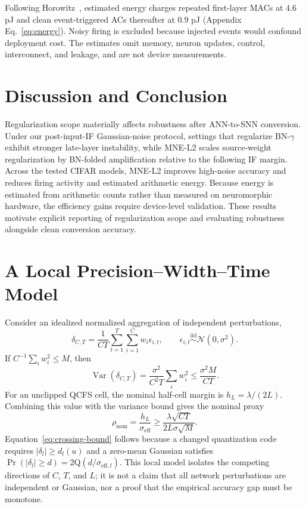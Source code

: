 \documentclass{article}
\begin{document}
Following Horowitz~\cite{horowitz2014computing}, estimated energy charges repeated first-layer MACs at $4.6$ pJ and clean event-triggered ACs thereafter at $0.9$ pJ (Appendix Eq.~\ref{eq:energy}). Noisy firing is excluded because injected events would confound deployment cost. The estimates omit memory, neuron updates, control, interconnect, and leakage, and are not device measurements.
\FloatBarrier

\section{Discussion and Conclusion}

Regularization scope materially affects robustness after ANN-to-SNN conversion. Under our post-input-IF Gaussian-noise protocol, settings that regularize BN-$\gamma$ exhibit stronger late-layer instability, while MNE-L2 scales source-weight regularization by BN-folded amplification relative to the following IF margin. Across the tested CIFAR models, MNE-L2 improves high-noise accuracy and reduces firing activity and estimated arithmetic energy. Because energy is estimated from arithmetic counts rather than measured on neuromorphic hardware, the efficiency gains require device-level validation. These results motivate explicit reporting of regularization scope and evaluating robustness alongside clean conversion accuracy.

\clearpage



\appendix

\section{A Local Precision--Width--Time Model}
\label{app:local-model}

Consider an idealized normalized aggregation of independent perturbations,
\begin{equation}
\delta_{C,T}=\frac{1}{CT}\sum_{t=1}^{T}\sum_{i=1}^{C}w_i\epsilon_{i,t},
\qquad \epsilon_{i,t}\overset{\mathrm{iid}}{\sim}\mathcal{N}(0,\sigma^2).
\end{equation}
If $C^{-1}\sum_i w_i^2\leq M$, then
\begin{equation}
\operatorname{Var}(\delta_{C,T})
=\frac{\sigma^2}{C^2T}\sum_iw_i^2
\leq\frac{\sigma^2M}{CT}.
\end{equation}
For an unclipped QCFS cell, the nominal half-cell margin is $h_L=\lambda/(2L)$. Combining this value with the variance bound gives the nominal proxy
\begin{equation}
\rho_{\mathrm{nom}}=\frac{h_L}{\sigma_{\mathrm{eff}}}
\geq \frac{\lambda\sqrt{CT}}{2L\sigma\sqrt{M}}.
\end{equation}
Equation~\eqref{eq:crossing-bound} follows because a changed quantization code requires $|\delta_l|\geq d_l(u)$ and a zero-mean Gaussian satisfies $\Pr(|\delta_l|\geq d)=2\mathrm{Q}(d/\sigma_{\mathrm{eff},l})$. This local model isolates the competing directions of $C$, $T$, and $L$; it is not a claim that all network perturbations are independent or Gaussian, nor a proof that the empirical accuracy gap must be monotone.
\end{document}
